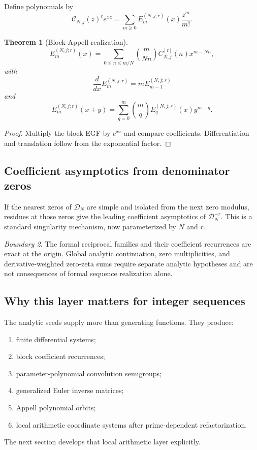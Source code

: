 \documentclass[11pt]{article}
\newtheorem{theorem}{Theorem}[section]\newtheorem{proposition}[theorem]{Proposition}\newtheorem{lemma}[theorem]{Lemma}\newtheorem{corollary}[theorem]{Corollary}
\theoremstyle{definition}\newtheorem{definition}[theorem]{Definition}\newtheorem{example}[theorem]{Example}\newtheorem{construction}[theorem]{Construction}\newtheorem{algorithm}[theorem]{Algorithm}\newtheorem{conjecture}[theorem]{Conjecture}\newtheorem{problem}[theorem]{Problem}
\theoremstyle{remark}\newtheorem{remark}[theorem]{Remark}\newtheorem{boundary}[theorem]{Boundary}\newtheorem{certificate}[theorem]{Computational Certificate}\newtheorem{classical}[theorem]{Classical Input}\newtheorem{principle}[theorem]{Structural Principle}
\begin{document}
Define polynomials by
\[
 \mathcal C_{N,j}(z)^r e^{xz}
 =\sum_{m\geq0}E_m^{(N,j;r)}(x)\frac{z^m}{m!}.
\]

\begin{theorem}[Block-Appell realization]
\[
 \boxed{E_m^{(N,j;r)}(x)=\sum_{0\leq n\leq m/N}\binom{m}{Nn}C_{N,j}^{[r]}(n)x^{m-Nn},}
\]
with
\[
 \frac{d}{dx}E_m^{(N,j;r)}=mE_{m-1}^{(N,j;r)}
\]
and
\[
 E_m^{(N,j;r)}(x+y)=\sum_{q=0}^{m}\binom mqE_q^{(N,j;r)}(x)y^{m-q}.
\]
\end{theorem}
\begin{proof}
Multiply the block EGF by $e^{xz}$ and compare coefficients.  Differentiation and translation follow from the exponential factor.
\end{proof}

\subsection{Coefficient asymptotics from denominator zeros}
If the nearest zeros of $\mathcal D_N$ are simple and isolated from the next zero modulus, residues at those zeros give the leading coefficient asymptotics of $\mathcal D_N^{-r}$.  This is a standard singularity mechanism, now parameterized by $N$ and $r$.

\begin{boundary}
The formal reciprocal families and their coefficient recurrences are exact at the origin.  Global analytic continuation, zero multiplicities, and derivative-weighted zero-zeta sums require separate analytic hypotheses and are not consequences of formal sequence realization alone.
\end{boundary}

\subsection{Why this layer matters for integer sequences}
The analytic seeds supply more than generating functions.  They produce:
\begin{enumerate}
\item finite differential systems;
\item block coefficient recurrences;
\item parameter-polynomial convolution semigroups;
\item generalized Euler inverse matrices;
\item Appell polynomial orbits;
\item local arithmetic coordinate systems after prime-dependent refactorization.
\end{enumerate}
The next section develops that local arithmetic layer explicitly.
\end{document}
